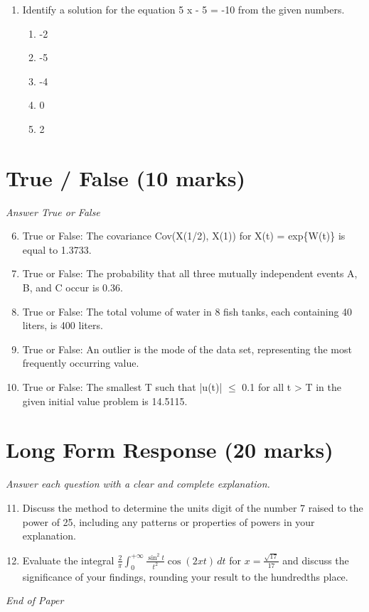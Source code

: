 \documentclass[12pt]{article}
\begin{document}
\begin{enumerate}[label=\arabic*.]
\begin{enumerate}[label=(\alph*)]
    \item 17 over 2
    \item 34 over 4
    \item 16 over 2
    \item 19 over 2
    \item 33 over 4
\end{enumerate}
\item Identify a solution for the equation 5 x - 5 = -10 from the given numbers.
\begin{enumerate}[label=(\alph*)]
    \item -2
    \item -5
    \item -4
    \item 0
    \item 2
\end{enumerate}
\end{enumerate}

\section*{True / False (10 marks)}
\textit{Answer True or False}
\begin{enumerate}[label=\arabic*.]
\setcounter{enumi}{5}
\item True or False: The covariance Cov(X(1/2), X(1)) for X(t) = exp\{W(t)\} is equal to 1.3733.
\item True or False: The probability that all three mutually independent events A, B, and C occur is 0.36.
\item True or False: The total volume of water in 8 fish tanks, each containing 40 liters, is 400 liters.
\item True or False: An outlier is the mode of the data set, representing the most frequently occurring value.
\item True or False: The smallest T such that |u(t)| \ensuremath{\leq} 0.1 for all t \textgreater{} T in the given initial value problem is 14.5115.
\end{enumerate}

\section*{Long Form Response (20 marks)}
\textit{Answer each question with a clear and complete explanation.}
\begin{enumerate}[label=\arabic*.]
\setcounter{enumi}{10}
\item Discuss the method to determine the units digit of the number 7 raised to the power of 25, including any patterns or properties of powers in your explanation.
\item Evaluate the integral \( \frac{2}{\pi} \int_0^{+\infty} \frac{\sin^2 t}{t^2} \cos(2 xt) \, dt \) for \( x = \frac{\sqrt{17}}{17} \) and discuss the significance of your findings, rounding your result to the hundredths place.
\end{enumerate}

\vfill
\noindent\textit{End of Paper}
\end{document}
